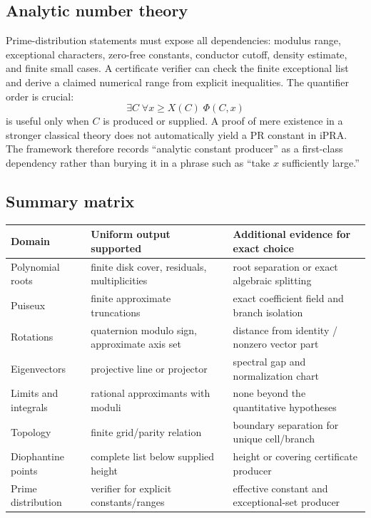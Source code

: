 \subsection{Analytic number theory}

Prime-distribution statements must expose all dependencies:
modulus range, exceptional characters, zero-free constants, conductor cutoff,
density estimate, and finite small cases.  A certificate verifier can check
the finite exceptional list and derive a claimed numerical range from
explicit inequalities.  The quantifier order is crucial:
\[
  \exists C\;\forall x\ge X(C)\;\Phi(C,x)
\]
is useful only when \(C\) is produced or supplied.  A proof of mere existence
in a stronger classical theory does not automatically yield a PR constant in
iPRA.  The framework therefore records ``analytic constant producer'' as a
first-class dependency rather than burying it in a phrase such as ``take
\(x\) sufficiently large.''

\subsection{Summary matrix}

\begin{longtable}{p{.22\linewidth}p{.34\linewidth}p{.34\linewidth}}
\toprule
\textbf{Domain} & \textbf{Uniform output supported} &
\textbf{Additional evidence for exact choice}\\
\midrule
\endhead
Polynomial roots & finite disk cover, residuals, multiplicities &
root separation or exact algebraic splitting\\
Puiseux & finite approximate truncations &
exact coefficient field and branch isolation\\
Rotations & quaternion modulo sign, approximate axis set &
distance from identity / nonzero vector part\\
Eigenvectors & projective line or projector &
spectral gap and normalization chart\\
Limits and integrals & rational approximants with moduli &
none beyond the quantitative hypotheses\\
Topology & finite grid/parity relation &
boundary separation for unique cell/branch\\
Diophantine points & complete list below supplied height &
height or covering certificate producer\\
Prime distribution & verifier for explicit constants/ranges &
effective constant and exceptional-set producer\\
\bottomrule
\end{longtable}
